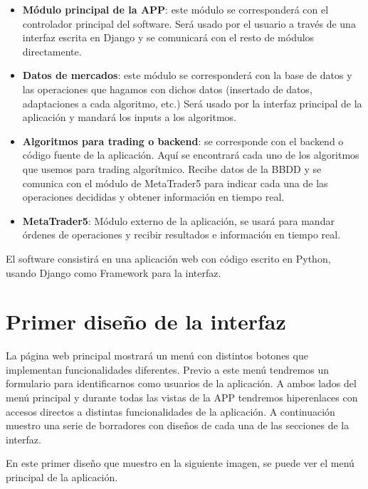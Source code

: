 \begin{itemize}
	\item \textbf{Módulo principal de la APP}: este módulo se corresponderá con el controlador principal del software. Será usado por el usuario a través de una interfaz escrita en Django y se comunicará con el resto de módulos directamente.
	\item \textbf{Datos de mercados}: este módulo se corresponderá con la base de datos y las operaciones que hagamos con dichos datos (insertado de datos, adaptaciones a cada algoritmo, etc.) Será usado por la interfaz principal de la aplicación y mandará los inputs a los algoritmos.
	\item \textbf{Algoritmos para trading o backend}: se corresponde con el backend o código fuente de la aplicación. Aquí se encontrará cada uno de los algoritmos que usemos para trading algorítmico. Recibe datos de la BBDD y se comunica con el módulo de MetaTrader5 para indicar cada una de las operaciones decididas y obtener información en tiempo real.
	\item \textbf{MetaTrader5}: Módulo externo de la aplicación, se usará para mandar órdenes de operaciones y recibir resultados e información en tiempo real.
\end{itemize}

El software consistirá en una aplicación web con código escrito en Python, usando Django como Framework para la interfaz.


\section{Primer diseño de la interfaz}

La página web principal mostrará un menú con distintos botones que implementan funcionalidades diferentes. Previo a este menú tendremos un formulario para identificarnos como usuarios de la aplicación. A ambos lados del menú principal y durante todas las vistas de la APP tendremos hiperenlaces con accesos directos a distintas funcionalidades de la aplicación. A continuación muestro una serie de borradores con diseños de cada una de las secciones de la interfaz.\newline

En este primer diseño que muestro en la siguiente imagen, se puede ver el menú principal de la aplicación.\newline

